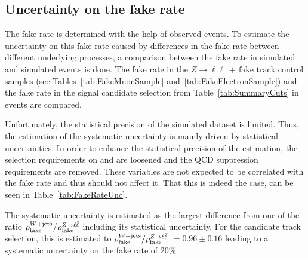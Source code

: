 \subsection{Uncertainty on the fake rate}
\label{sec:FakeRateUncertainty}
The fake rate \fakerate is determined with the help of observed \Zlep events.
To estimate the uncertainty on this fake rate caused by differences in the fake rate between different underlying processes, a comparison between the fake rate in simulated \ZlepJets and simulated \WJets events is done.
The fake rate in the $Z\rightarrow\ell \bar{\ell}\,+\,\text{fake track}$  control samples (see Tables~\ref{tab:FakeMuonSample} and~\ref{tab:FakeElectronSample}) 
and the fake rate in the signal candidate selection from Table~\ref{tab:SummaryCuts} in \WJets events are compared.

Unfortunately, the statistical precision of the simulated \WJets dataset is limited.
Thus, the estimation of the systematic uncertainty is mainly driven by statistical uncertainties.
In order to enhance the statistical precision of the estimation, the selection requirements on \met and \ptfirstjet are loosened and the QCD suppression requirements are removed.
These variables are not expected to be correlated with the fake rate and thus should not affect it.
That this is indeed the case, can be seen in Table~\ref{tab:FakeRateUnc}.

The systematic uncertainty is estimated as the largest difference from one of the ratio $\rho_{\text{fake}}^{W+\text{jets}}$/$\rho_{\text{fake}}^{Z\rightarrow\ell\bar{\ell}}$ including its statistical uncertainty.
For the candidate track selection, this is estimated to $\rho_{\text{fake}}^{W+\text{jets}}/\rho_{\text{fake}}^{Z\rightarrow\ell\bar{\ell}}$ $ =  0.96 \pm 0.16 $ leading to a systematic uncertainty on the fake rate of 20\%.

